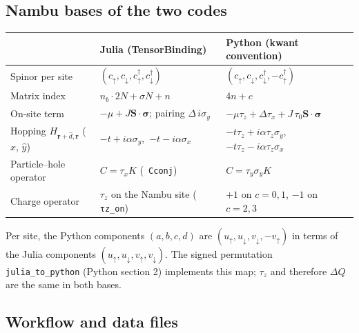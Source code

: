 \documentclass[11pt]{article}
\renewcommand{\code}[1]{\texttt{\hyphenchar\font=-1 #1}}
\begin{document}
\subsection{Nambu bases of the two codes}

\begin{center}
\begin{tabular}{lll}
\toprule
 & Julia (TensorBinding) & Python (kwant convention)\\
\midrule
Spinor per site & $(c_\uparrow, c_\downarrow, c^\dagger_\uparrow, c^\dagger_\downarrow)$ & $(c_\uparrow, c_\downarrow, c^\dagger_\downarrow, -c^\dagger_\uparrow)$\\
Matrix index & $n_b\cdot2N + \sigma N + n$ & $4n + c$\\
On-site term & $-\mu + J\mathbf S\cdot\boldsymbol\sigma$; pairing $\Delta\,i\sigma_y$ & $-\mu\tau_z + \Delta\tau_x + J\,\tau_0\mathbf S\cdot\boldsymbol\sigma$\\
Hopping $H_{\mathbf r+\hat d,\mathbf r}$ ($\hat x$, $\hat y$) & $-t + i\alpha\sigma_y$,\ $-t - i\alpha\sigma_x$ & $-t\tau_z + i\alpha\tau_z\sigma_y$,\ $-t\tau_z - i\alpha\tau_z\sigma_x$\\
Particle--hole operator & $C = \tau_xK$ (\code{Cconj}) & $C = \tau_y\sigma_yK$\\
Charge operator & $\tau_z$ on the Nambu site (\code{τz\_on}) & $+1$ on $c = 0,1$, $-1$ on $c = 2,3$\\
\bottomrule
\end{tabular}
\end{center}
Per site, the Python components $(a,b,c,d)$ are $(u_\uparrow, u_\downarrow, v_\downarrow, -v_\uparrow)$ in terms of the Julia components
$(u_\uparrow,u_\downarrow,v_\uparrow,v_\downarrow)$. The signed permutation \code{julia\_to\_python} (Python section 2) implements this map; $\tau_z$
and therefore $\Delta Q$ are the same in both bases.

\subsection{Workflow and data files}
\end{document}
